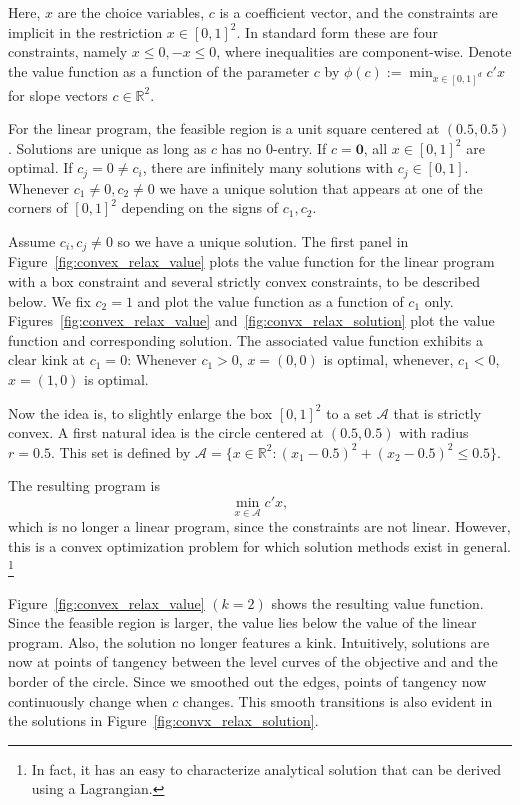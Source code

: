 \documentclass[12pt,a4paper,english]{article} %
\numberwithin{equation}{section}
\theoremstyle{definition}
\theoremstyle{remark}
\theoremstyle{plain}
\begin{document}
Here, $x$ are the choice variables, $c$ is a coefficient vector, and the constraints are implicit in the restriction $x \in [0,1]^2$.
In standard form these are four constraints, namely $x \leq 0, -x \leq 0$, where inequalities are component-wise.
Denote the value function as a function of the parameter $c$ by $\phi(c) := \min_{x\in[0,1]^d} c'x$ for slope vectors $c\in \mathbb{R}^2$.

For the linear program, the feasible region is a unit square centered at $(0.5, 0.5)$. Solutions are unique as long as $c$ has no $0$-entry.
If $c=\mathbf{0}$, all $x\in [0,1]^2$ are optimal. If $c_j = 0 \neq c_i$, there are infinitely many solutions with $c_j \in [0,1]$.
Whenever $c_1\neq0, c_2\neq0$ we have a unique solution that appears at one of the corners of $[0,1]^2$ depending on the signs of $c_1, c_2$.

Assume $c_i, c_j \neq 0$ so we have a unique solution.
The first panel in Figure~\ref{fig:convex_relax_value} plots the value function for the linear program with a box constraint and several strictly convex constraints, to be described below.
We fix $c_2 = 1$ and plot the value function as a function of $c_1$ only.
Figures~\ref{fig:convex_relax_value} and~\ref{fig:convx_relax_solution} plot the value function and corresponding solution.
The associated value function exhibits a clear kink at $c_1 = 0$: Whenever $c_1 > 0$, $x = (0, 0)$ is optimal, whenever, $c_1 < 0$, $x=(1,0)$ is optimal.

Now the idea is, to slightly enlarge the box $[0,1]^2$ to a set $\mathcal{A}$ that is strictly convex.
A first natural idea is the circle centered at $(0.5, 0.5)$ with radius $r=0.5$.
This set is defined by $\mathcal{A} = \{x \in \mathbb{R}^2: (x_1 - 0.5)^2 + (x_2 - 0.5)^2 \leq 0.5\}$.

The resulting program is
\begin{equation}
	\min_{x\in\mathcal{A}} c'x,
\end{equation}
which is no longer a linear program, since the constraints are not linear.
However, this is a convex optimization problem for which solution methods exist in general.
\footnote{In fact, it has an easy to characterize analytical solution that can be derived using a Lagrangian.}

Figure~\ref{fig:convex_relax_value} $(k=2)$ shows the resulting value function.
Since the feasible region is larger, the value lies below the value of the linear program.
Also, the solution no longer features a kink.
Intuitively, solutions are now at points of tangency between the level curves of the objective and and the border of the circle.
Since we smoothed out the edges, points of tangency now continuously change when $c$ changes.
This smooth transitions is also evident in the solutions in Figure~\ref{fig:convx_relax_solution}.
\end{document}
